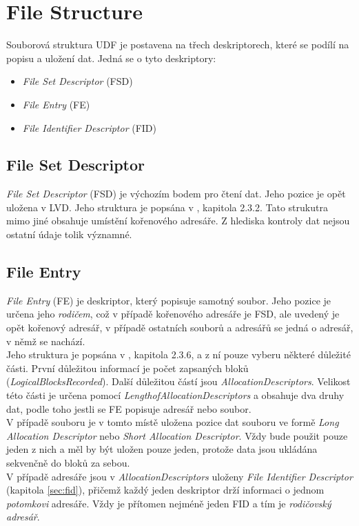 \section{File Structure}
\label{sec:fsd}
Souborová struktura UDF je postavena na třech deskriptorech, které se podílí na popisu a uložení dat. Jedná se o tyto deskriptory:
\begin{itemize}
    \item \textit{File Set Descriptor} (FSD)
    \item \textit{File Entry} (FE)
    \item \textit{File Identifier Descriptor} (FID)
\end{itemize}

\subsection{File Set Descriptor}
\label{sec:fsd}
\textit{File Set Descriptor} (FSD) je výchozím bodem pro čtení dat. Jeho pozice je opět uložena v LVD. Jeho struktura je popsána v \cite{osta-udf-0201}, kapitola 2.3.2. Tato strukutra mimo jiné obsahuje umístění kořenového adresáře. Z hlediska kontroly dat nejsou ostatní údaje tolik významné.

\subsection{File Entry}
\label{sec:fe}
\textit{File Entry} (FE) je deskriptor, který popisuje samotný soubor. Jeho pozice je určena jeho \textit{rodičem}, což v případě kořenového adresáře je FSD, ale uvedený je opět kořenový adresář, v případě ostatních souborů a adresářů se jedná o adresář, v němž se nachází.\\
Jeho struktura je popsána v \cite{osta-udf-0201}, kapitola 2.3.6, a z ní pouze vyberu některé důležité části. První důležitou informací je počet zapsaných bloků (\textit{LogicalBlocksRecorded}). Další důležitou částí jsou \textit{AllocationDescriptors}. Velikost této části je určena pomocí \textit{LengthofAllocationDescriptors} a obsahuje dva druhy dat, podle toho jestli se FE popisuje adresář nebo soubor.\\
V případě souboru je v tomto místě uložena pozice dat souboru ve formě \textit{Long Allocation Descriptor} nebo \textit{Short Allocation Descriptor}. Vždy bude použit pouze jeden z nich a měl by být uložen pouze jeden, protože data jsou ukládána sekvenčně do bloků za sebou.\\
V případě adresáře jsou v \textit{AllocationDescriptors} uloženy \textit{File Identifier Descriptor} (kapitola \ref{sec:fid}), přičemž každý jeden deskriptor drží informaci o jednom \textit{potomkovi} adresáře. Vždy je přítomen nejméně jeden FID a tím je \textit{rodičovský adresář}. 

